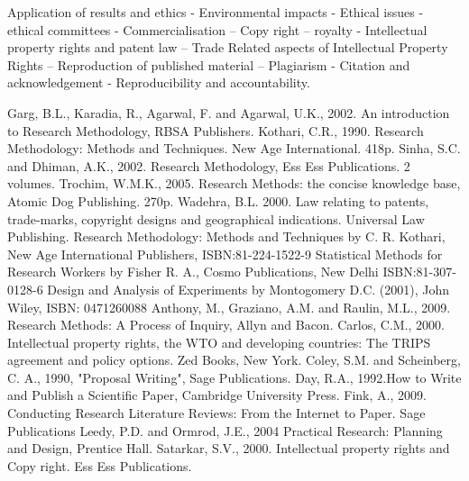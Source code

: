 Application of results and ethics - Environmental impacts - Ethical issues - ethical committees - Commercialisation – Copy right – royalty - Intellectual property rights and patent law – Trade Related aspects of Intellectual Property Rights – Reproduction of published material – Plagiarism - Citation and acknowledgement - Reproducibility and accountability.  
\begin{thebibliography}{99} 
     Garg, B.L., Karadia, R., Agarwal, F. and Agarwal, U.K., 2002. An introduction to Research Methodology, RBSA Publishers. 
     Kothari, C.R., 1990. Research Methodology: Methods and Techniques. New Age International. 418p. 
     Sinha, S.C. and Dhiman, A.K., 2002. Research Methodology, Ess Ess Publications. 2 volumes.
     Trochim, W.M.K., 2005. Research Methods: the concise knowledge base, Atomic Dog Publishing. 270p.
     Wadehra, B.L. 2000. Law relating to patents, trade-marks, copyright designs and geographical indications. Universal Law Publishing. 
     Research Methodology: Methods and Techniques by C. R. Kothari, New Age International Publishers, ISBN:81-224-1522-9 
     Statistical Methods for Research Workers by Fisher R. A., Cosmo Publications, New Delhi ISBN:81-307-0128-6 
     Design and Analysis of Experiments by Montogomery D.C. (2001), John Wiley, ISBN: 0471260088  
     Anthony, M., Graziano, A.M. and Raulin, M.L., 2009. Research Methods: A Process of Inquiry, Allyn and Bacon. 
     Carlos, C.M., 2000. Intellectual property rights, the WTO and developing countries: The TRIPS agreement and policy options. Zed Books, New York. 
     Coley, S.M. and Scheinberg, C. A., 1990, "Proposal Writing", Sage Publications. 
     Day, R.A., 1992.How to Write and Publish a Scientific Paper, Cambridge University Press. 
     Fink, A., 2009. Conducting Research Literature Reviews: From the Internet to Paper. Sage Publications 
     Leedy, P.D. and Ormrod, J.E., 2004 Practical Research: Planning and Design, Prentice Hall. 
     Satarkar, S.V., 2000. Intellectual property rights and Copy right. Ess Ess Publications. 
\end{thebibliography}

\subsection{\courseinfo}

